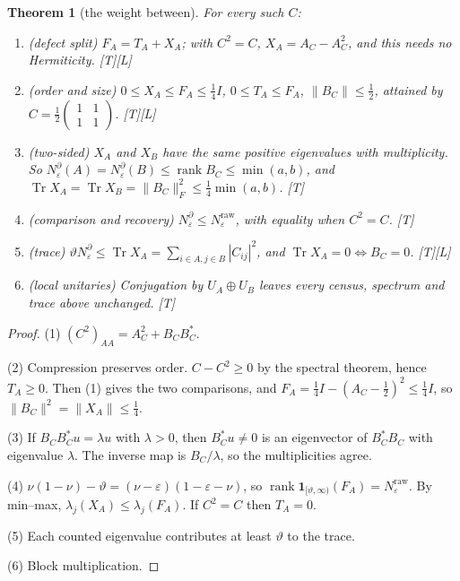 \documentclass[11pt]{article}
\newtheorem{theorem}{Theorem}[section]
\theoremstyle{definition}
\newcommand{\grade}[1]{\textsf{\small[#1]}}
\newcommand{\Tr}{\operatorname{Tr}}
\newcommand{\rank}{\operatorname{rank}}
\begin{document}
\begin{theorem}[the weight between]\label{thm:weight}
For every such $C$:
\begin{enumerate}
\item (defect split) $F_A=T_A+X_A$; with $C^2=C$, $X_A=A_C-A_C^2$, and this needs no Hermiticity. \grade{T}\grade{L}
\item (order and size) $0\le X_A\le F_A\le\tfrac14I$, $0\le T_A\le F_A$, $\|B_C\|\le\tfrac12$, attained by $C=\tfrac12\begin{pmatrix}1&1\\1&1\end{pmatrix}$. \grade{T}\grade{L}
\item (two-sided) $X_A$ and $X_B$ have the same positive eigenvalues with multiplicity. So $N^\partial_\varepsilon(A)=N^\partial_\varepsilon(B)\le\rank B_C\le\min(a,b)$, and $\Tr X_A=\Tr X_B=\|B_C\|_F^2\le\tfrac14\min(a,b)$. \grade{T}
\item (comparison and recovery) $N^\partial_\varepsilon\le N^{\mathrm{raw}}_\varepsilon$, with equality when $C^2=C$. \grade{T}
\item (trace) $\vartheta N^\partial_\varepsilon\le\Tr X_A=\sum_{i\in A,j\in B}|C_{ij}|^2$, and $\Tr X_A=0\iff B_C=0$. \grade{T}\grade{L}
\item (local unitaries) Conjugation by $U_A\oplus U_B$ leaves every census, spectrum and trace above unchanged. \grade{T}
\end{enumerate}
\end{theorem}
\begin{proof}
(1) $(C^2)_{AA}=A_C^2+B_CB_C^*$.

(2) Compression preserves order. $C-C^2\ge0$ by the spectral theorem, hence $T_A\ge0$. Then (1) gives the two comparisons, and $F_A=\tfrac14I-(A_C-\tfrac12)^2\le\tfrac14I$, so $\|B_C\|^2=\|X_A\|\le\tfrac14$.

(3) If $B_CB_C^*u=\lambda u$ with $\lambda>0$, then $B_C^*u\ne0$ is an eigenvector of $B_C^*B_C$ with eigenvalue $\lambda$. The inverse map is $B_C/\lambda$, so the multiplicities agree.

(4) $\nu(1-\nu)-\vartheta=(\nu-\varepsilon)(1-\varepsilon-\nu)$, so $\rank\mathbf 1_{[\vartheta,\infty)}(F_A)=N^{\mathrm{raw}}_\varepsilon$. By min--max, $\lambda_j(X_A)\le\lambda_j(F_A)$. If $C^2=C$ then $T_A=0$.

(5) Each counted eigenvalue contributes at least $\vartheta$ to the trace.

(6) Block multiplication.
\end{proof}
\end{document}
